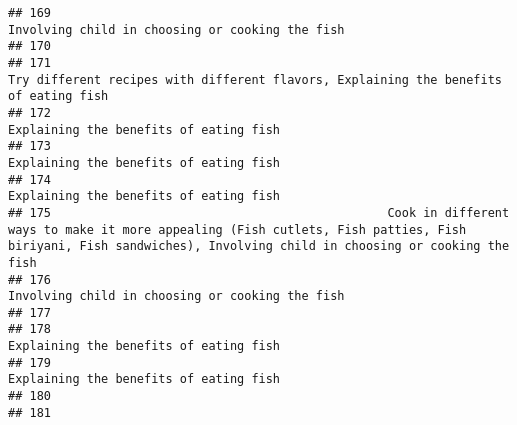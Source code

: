 \documentclass[
]{article}
\begin{document}
\begin{verbatim}
## 169                                                                                                                                                              Involving child in choosing or cooking the fish
## 170                                                                                                                                                                                                             
## 171                                                                                                                         Try different recipes with different flavors, Explaining the benefits of eating fish
## 172                                                                                                                                                                       Explaining the benefits of eating fish
## 173                                                                                                                                                                       Explaining the benefits of eating fish
## 174                                                                                                                                                                       Explaining the benefits of eating fish
## 175                                               Cook in different ways to make it more appealing (Fish cutlets, Fish patties, Fish biriyani, Fish sandwiches), Involving child in choosing or cooking the fish
## 176                                                                                                                                                              Involving child in choosing or cooking the fish
## 177                                                                                                                                                                                                             
## 178                                                                                                                                                                       Explaining the benefits of eating fish
## 179                                                                                                                                                                       Explaining the benefits of eating fish
## 180                                                                                                                                                                                                             
## 181                                                                                                                                                                                                             

\end{verbatim}
\end{document}

